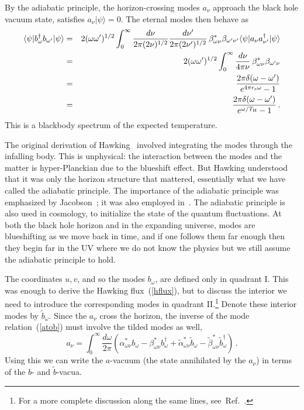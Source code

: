 \documentclass[12pt]{article}
\newcommand{\be}{\begin{equation}}
\newcommand{\ee}{\end{equation}}
\newcommand{\bea}{\begin{eqnarray}}
\newcommand{\eea}{\end{eqnarray}}
\newcommand{\rmx}{\rm}
\newcommand{\rs}{r_{\rmx s}}
\begin{document}
By the adiabatic principle, the horizon-crossing modes $a_\nu$ approach the 
 black hole vacuum state, satisfies $a_\nu | \psi \rangle = 0$.  The eternal modes then behave as
\bea
\langle \psi | b_\omega^\dagger b_{\omega'} | \psi \rangle &=& 2(\omega\omega')^{1/2}\int_{0}^\infty \frac{d\nu}{2\pi(2\nu)^{1/2}}\frac{d\nu'}{2\pi(2\nu')^{1/2}}
\,\beta_{\omega\nu}^*\beta_{\omega'\nu'}  \langle \psi | a_\nu a_{\nu'}^\dagger | \psi \rangle \nonumber\\
&=& 2(\omega\omega')^{1/2}\int_{0}^\infty \frac{d\nu}{4\pi \nu}
\,\beta_{\omega\nu}^*\beta_{\omega'\nu}  \nonumber\\
&=& \frac{2\pi \delta(\omega-\omega')}{e^{4\pi  \rs \omega} - 1} \nonumber\\
&=& \frac{2\pi \delta(\omega-\omega')}{e^{\omega/T_{\rmx H}} - 1}  \,. \label{hflux}
\eea
This is a blackbody spectrum of the expected temperature.  

The original derivation of Hawking~\cite{Hawking:1974sw} involved integrating the modes through the infalling body.  This is unphysical: the interaction between the modes and the matter is hyper-Planckian due to the blueshift effect.  But Hawking understood that it was only the horizon structure that mattered, essentially what we have called the adiabatic principle.  The importance of the adiabatic principle was emphasized by Jacobson~\cite{Jacobson:2003vx}; it was also employed in~\cite{Mukhanov:2007zz}.
The adiabatic principle is also used in cosmology, to initialize the state of the quantum fluctuations.  At both the black hole horizon and in the expanding universe, modes are blueshifting as we move back in time, and if one follows them far enough then they begin far in the UV where we do not know the physics but we still assume the adiabatic principle to hold.

The coordinates $u,v$, and so the modes $b_\omega$, are defined only in quadrant \mbox{I}.  This was enough to derive the Hawking flux~(\ref{hflux}),
but to discuss the interior  we need to introduce the corresponding modes in quadrant \mbox{II}.\footnote{For a more complete discussion along the same lines, see~Ref.~\cite{Giddings:1992ff}.}
  Denote these interior modes by $\tilde b_\omega$.   Since the $a_\nu$ cross the horizon, the inverse of the mode relation~(\ref{atob}) must involve the tilded modes as well,
\be
a_\nu = \int_{0}^\infty \frac{d\omega}{2\pi}\left( \alpha^*_{\omega\nu} b_{\omega} - \beta^*_{\omega\nu} b_{\omega}^\dagger 
+  \tilde\alpha^*_{\omega\nu} \tilde b_{\omega} - \tilde\beta^*_{\omega\nu} \tilde b_{\omega}^\dagger \right)\,. \label{btoa}
\ee
Using this we can write the $a$-vacuum (the state annihilated by the $a_\nu$) in terms of the $b$- and $\tilde b$-vacua.  
\end{document}
